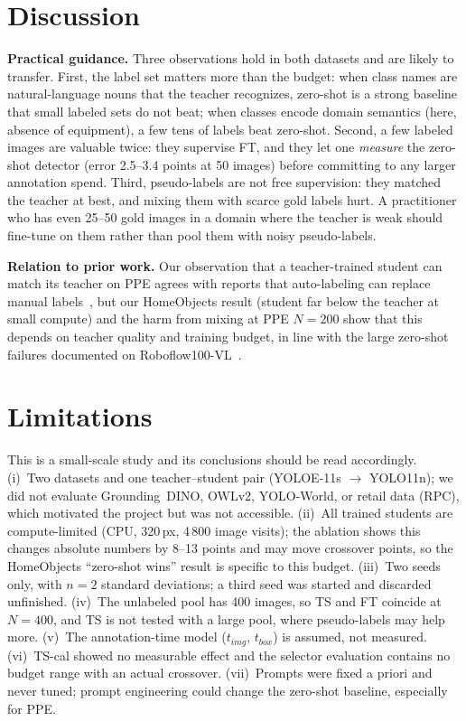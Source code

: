 \documentclass[conference]{IEEEtran}
\begin{document}
\section{Discussion}
\textbf{Practical guidance.} Three observations hold in both datasets and are likely to transfer. First, the label set matters more than the budget: when class names are natural-language nouns that the teacher recognizes, zero-shot is a strong baseline that small labeled sets do not beat; when classes encode domain semantics (here, absence of equipment), a few tens of labels beat zero-shot. Second, a few labeled images are valuable twice: they supervise FT, and they let one \emph{measure} the zero-shot detector (error 2.5--3.4 points at 50 images) before committing to any larger annotation spend. Third, pseudo-labels are not free supervision: they matched the teacher at best, and mixing them with scarce gold labels hurt. A practitioner who has even 25--50 gold images in a domain where the teacher is weak should fine-tune on them rather than pool them with noisy pseudo-labels.

\textbf{Relation to prior work.} Our observation that a teacher-trained student can match its teacher on PPE agrees with reports that auto-labeling can replace manual labels~\cite{son2024teacherstudent,abid2025waste}, but our HomeObjects result (student far below the teacher at small compute) and the harm from mixing at PPE $N{=}200$ show that this depends on teacher quality and training budget, in line with the large zero-shot failures documented on Roboflow100-VL~\cite{robicheaux2025rf100vl}.

\section{Limitations}
This is a small-scale study and its conclusions should be read accordingly. (i)~Two datasets and one teacher--student pair (YOLOE-11s $\rightarrow$ YOLO11n); we did not evaluate Grounding~DINO, OWLv2, YOLO-World, or retail data (RPC), which motivated the project but was not accessible. (ii)~All trained students are compute-limited (CPU, 320\,px, 4\,800 image visits); the ablation shows this changes absolute numbers by 8--13 points and may move crossover points, so the HomeObjects ``zero-shot wins'' result is specific to this budget. (iii)~Two seeds only, with $n{=}2$ standard deviations; a third seed was started and discarded unfinished. (iv)~The unlabeled pool has 400 images, so TS and FT coincide at $N{=}400$, and TS is not tested with a large pool, where pseudo-labels may help more. (v)~The annotation-time model ($t_{img}$, $t_{box}$) is assumed, not measured. (vi)~TS-cal showed no measurable effect and the selector evaluation contains no budget range with an actual crossover. (vii)~Prompts were fixed a priori and never tuned; prompt engineering could change the zero-shot baseline, especially for PPE.
\end{document}
